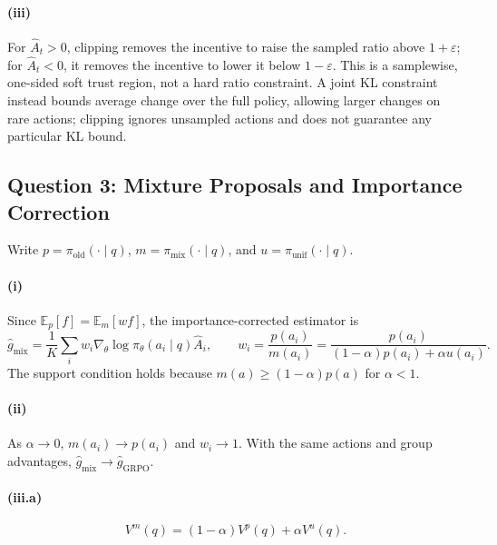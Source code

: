\paragraph{(iii)}
For $\hat A_t>0$, clipping removes the incentive to raise the sampled ratio above
$1+\varepsilon$; for $\hat A_t<0$, it removes the incentive to lower it below
$1-\varepsilon$.  This is a samplewise, one-sided soft trust region, not a hard ratio
constraint.  A joint KL constraint instead bounds average change over the full policy,
allowing larger changes on rare actions; clipping ignores unsampled actions and does not
guarantee any particular KL bound.

\subsection{Question 3: Mixture Proposals and Importance Correction}

Write $p=\pi_{\mathrm{old}}(\cdot\mid q)$, $m=\pi_{\mathrm{mix}}(\cdot\mid q)$, and
$u=\pi_{\mathrm{unif}}(\cdot\mid q)$.

\paragraph{(i)}
Since $\mathbb{E}_{p}[f]=\mathbb{E}_{m}[wf]$, the importance-corrected estimator is
\begin{equation}
 \hat g_{\mathrm{mix}}=\frac{1}{K}\sum_i
 w_i\nabla_\theta\log\pi_\theta(a_i\mid q)\hat A_i,
 \qquad
 \boxed{\displaystyle w_i=\frac{p(a_i)}{m(a_i)}
 =\frac{p(a_i)}{(1-\alpha)p(a_i)+\alpha u(a_i)}.}
 \label{eq:mixture-weight}
\end{equation}
The support condition holds because $m(a)\ge(1-\alpha)p(a)$ for $\alpha<1$.

\paragraph{(ii)}
As $\alpha\to0$, $m(a_i)\to p(a_i)$ and $w_i\to1$.  With the same actions and group
advantages, $\hat g_{\mathrm{mix}}\to\hat g_{\mathrm{GRPO}}$.

\paragraph{(iii.a)}
\begin{equation}
 V^m(q)=(1-\alpha)V^p(q)+\alpha V^u(q).
\end{equation}

